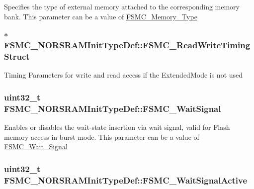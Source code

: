 Specifies the type of external memory attached to the corresponding memory bank. This parameter can be a value of \hyperlink{group__FSMC__Memory__Type}{FSMC\_\-Memory\_\-Type} \hypertarget{structFSMC__NORSRAMInitTypeDef_a33f8e281b9ff3187906309d005b4159e}{
\subsubsection[{FSMC\_\-ReadWriteTimingStruct}]{$\ast$ {\bf FSMC\_\-NORSRAMInitTypeDef::FSMC\_\-ReadWriteTimingStruct}}}
\label{structFSMC__NORSRAMInitTypeDef_a33f8e281b9ff3187906309d005b4159e}
Timing Parameters for write and read access if the ExtendedMode is not used \hypertarget{structFSMC__NORSRAMInitTypeDef_aedbc7df3ff61cc93a910a64dc53c932b}{
\subsubsection[{FSMC\_\-WaitSignal}]{\setlength{\rightskip}{0pt plus 5cm}uint32\_\-t {\bf FSMC\_\-NORSRAMInitTypeDef::FSMC\_\-WaitSignal}}}
\label{structFSMC__NORSRAMInitTypeDef_aedbc7df3ff61cc93a910a64dc53c932b}
Enables or disables the wait-\/state insertion via wait signal, valid for Flash memory access in burst mode. This parameter can be a value of \hyperlink{group__FSMC__Wait__Signal}{FSMC\_\-Wait\_\-Signal} \hypertarget{structFSMC__NORSRAMInitTypeDef_a71c6e7cc8e7e1a8fd0562960ffd23e88}{
\subsubsection[{FSMC\_\-WaitSignalActive}]{\setlength{\rightskip}{0pt plus 5cm}uint32\_\-t {\bf FSMC\_\-NORSRAMInitTypeDef::FSMC\_\-WaitSignalActive}}}
\label{structFSMC__NORSRAMInitTypeDef_a71c6e7cc8e7e1a8fd0562960ffd23e88}
